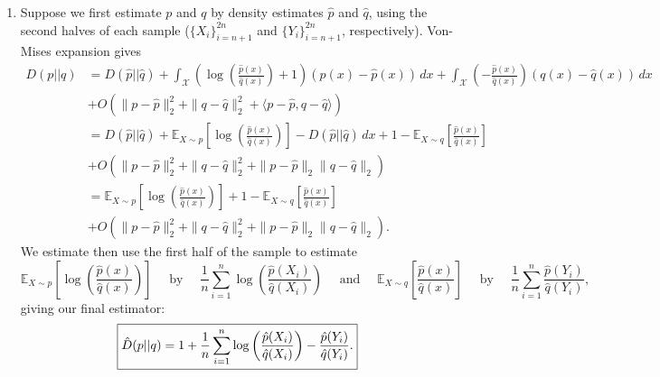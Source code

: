 \documentclass[11pt]{article}
\newcommand{\E}{\mathbb{E}} %
\newcommand{\X}{\mathcal{X}}
\begin{document}
\begin{enumerate}
\item Suppose we first estimate $p$ and $q$ by density estimates $\hat p$ and
$\hat q$, using the second halves of each sample ($\{X_i\}_{i = n + 1}^{2n}$
and $\{Y_i\}_{i = n + 1}^{2n}$, respectively). Von-Mises expansion gives
\begin{align*}
D(p||q)
 &  = D(\hat p||\hat q)
    + \int_\X \left( \log\left( \frac{\hat p(x)}{\hat q(x)} \right) + 1 \right)
            \left( p(x) - \hat p(x) \right) \, dx
    + \int_\X \left( -\frac{\hat p(x)}{\hat q(x)} \right)
                \left( q(x) - \hat q(x) \right) \, dx \\
 &  + O\left( \|p - \hat p\|_2^2
                + \|q - \hat q\|_2^2
                + \langle p - \hat p, q - \hat q \rangle
        \right) \\
 &  = D(\hat p||\hat q)
    + \E_{X \sim p}\left[
            \log \left( \frac{\hat p(x)}{\hat q(x)} \right)
      \right]
    - D(\hat p||\hat q) \, dx
    + 1 - \E_{X \sim q}\left[ \frac{\hat p(x)}{\hat q(x)} \right] \\
 &  + O\left( \|p - \hat p\|_2^2
                + \|q - \hat q\|_2^2
                + \|p - \hat p\|_2\|q - \hat q\|_2
        \right) \\
 &  = \E_{X \sim p}\left[
            \log \left( \frac{\hat p(x)}{\hat q(x)} \right)
      \right]
    + 1 - \E_{X \sim q}\left[ \frac{\hat p(x)}{\hat q(x)} \right] \\
 &  + O\left( \|p - \hat p\|_2^2
                + \|q - \hat q\|_2^2
                + \|p - \hat p\|_2\|q - \hat q\|_2
        \right).
\end{align*}
We estimate then use the first half of the sample to estimate
\[\E_{X \sim p}\left[ \log \left( \frac{\hat p(x)}{\hat q(x)} \right) \right]
    \quad \mbox{ by } \quad
    \frac{1}{n} \sum_{i = 1}^n
                        \log \left( \frac{\hat p(X_i)}{\hat q(X_i)} \right)
\quad \mbox{ and } \quad
\E_{X \sim q}\left[ \frac{\hat p(x)}{\hat q(x)} \right]
    \quad \mbox{ by } \quad
    \frac{1}{n} \sum_{i = 1}^n \frac{\hat p(Y_i)}{\hat q(Y_i)},\]
giving our final estimator:
\[\mbox{\fbox{$\displaystyle \hat D(p||q)
    = 1
    + \frac{1}{n} \sum_{i = 1}^n
            \log \left( \frac{\hat p(X_i)}{\hat q(X_i)} \right)
            - \frac{\hat p(Y_i)}{\hat q(Y_i)}$.}}
\]
\end{enumerate}
\end{document}
